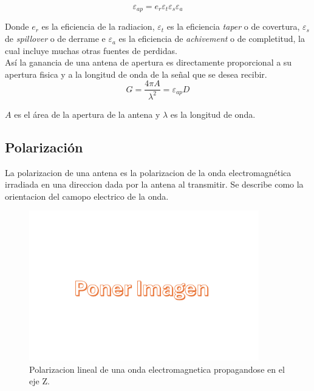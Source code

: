 \begin{equation}
    \varepsilon_{ap} = e_{r} \varepsilon_{t} \varepsilon_{s} \varepsilon_{a}
\end{equation}

Donde $e_{r}$ es la eficiencia de la radiacion, $\varepsilon_{t}$ es la eficiencia \textit{taper} o de covertura, $\varepsilon_{s}$ de \textit{spillover} o de derrame e $\varepsilon_{a}$ es la eficiencia de \textit{achivement} o de completitud, la cual incluye muchas otras fuentes de perdidas.\\

Así la ganancia de una antena de apertura es directamente proporcional a su apertura fisica y a la longitud de onda de la señal que se desea recibir.\\

\begin{equation}
    G = \frac{4\pi A}{\lambda^{2}} = \varepsilon_{ap} D
\end{equation}

$A$ es el área de la apertura de la antena y $\lambda$ es la longitud de onda.\\

\subsection{Polarización}

La polarizacion de una antena es la polarizacion de la onda electromagnética irradiada en una direccion dada por la antena al transmitir. Se describe como la orientacion del camopo electrico de la onda.\\

\begin{figure}
    \centering
    \includegraphics[width = 10cm]{img/imagen.png}
    \caption{Polarizacion lineal de una onda electromagnetica propagandose en el eje Z.}
    \label{fig:polarizacion}
\end{figure}


